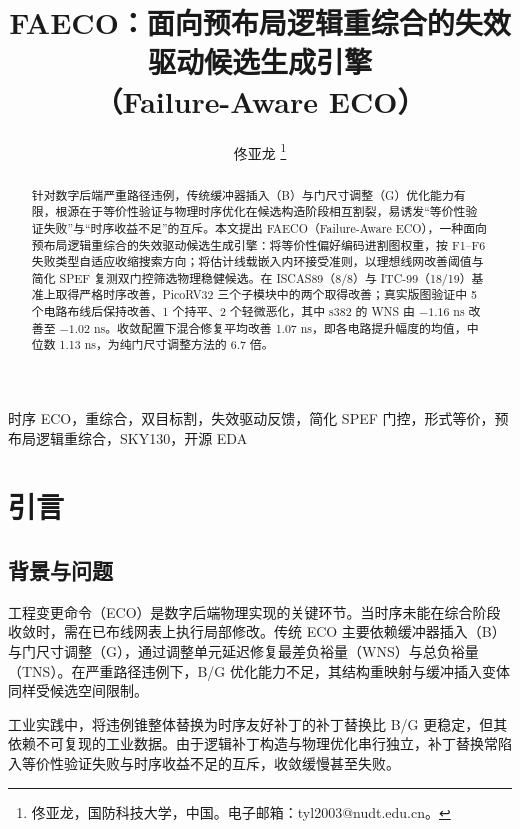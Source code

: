 \documentclass[journal]{IEEEtran}
\title{FAECO：面向预布局逻辑重综合的失效驱动候选生成引擎\\
（Failure-Aware ECO）}
\author{佟亚龙%
\thanks{佟亚龙，国防科技大学，中国。电子邮箱：tyl2003@nudt.edu.cn。}}
\begin{document}
\maketitle

\sloppy

\begin{abstract}
针对数字后端严重路径违例，传统缓冲器插入（B）与门尺寸调整（G）优化能力有限，根源在于等价性验证与物理时序优化在候选构造阶段相互割裂，易诱发“等价性验证失败”与“时序收益不足”的互斥。本文提出 FAECO（Failure-Aware ECO），一种面向预布局逻辑重综合的失效驱动候选生成引擎：将等价性偏好编码进割图权重，按 F1--F6 失败类型自适应收缩搜索方向；将估计线载嵌入内环接受准则，以理想线网改善阈值与简化 SPEF 复测双门控筛选物理稳健候选。在 ISCAS89（8/8）与 ITC-99（18/19）基准上取得严格时序改善，PicoRV32 三个子模块中的两个取得改善；真实版图验证中 5 个电路布线后保持改善、1 个持平、2 个轻微恶化，其中 s382 的 WNS 由 $-1.16$ ns 改善至 $-1.02$ ns。收敛配置下混合修复平均改善 1.07 ns，即各电路提升幅度的均值，中位数 1.13 ns，为纯门尺寸调整方法的 6.7 倍。
\end{abstract}

\begin{IEEEkeywords}
时序 ECO，重综合，双目标割，失效驱动反馈，简化 SPEF 门控，形式等价，预布局逻辑重综合，SKY130，开源 EDA
\end{IEEEkeywords}

\section{引言}

\subsection{背景与问题}

工程变更命令（ECO）是数字后端物理实现的关键环节。当时序未能在综合阶段收敛时，需在已布线网表上执行局部修改。传统 ECO 主要依赖缓冲器插入（B）与门尺寸调整（G），通过调整单元延迟修复最差负裕量（WNS）与总负裕量（TNS）。在严重路径违例下，B/G 优化能力不足，其结构重映射与缓冲插入变体同样受候选空间限制\cite{chen2012metal,chen2012fixability,liang2012buffer,ho2010eco}。

工业实践中，将违例锥整体替换为时序友好补丁的补丁替换比 B/G 更稳定，但其依赖不可复现的工业数据。由于逻辑补丁构造与物理优化串行独立，补丁替换常陷入等价性验证失败与时序收益不足的互斥，收敛缓慢甚至失败。
\end{document}
